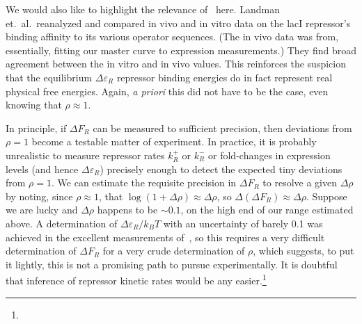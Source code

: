 We would also like to highlight the relevance of~\cite{Landman2019} here.
Landman et.\ al.\ reanalyzed and compared in vivo and in vitro data on the lacI
repressor's binding affinity to its various operator sequences. (The in vivo
data was from, essentially, fitting our master curve to expression
measurements.) They find broad agreement between the in vitro and in vivo
values. This reinforces the suspicion that the equilibrium $\Delta\varepsilon_R$
repressor binding energies do in fact represent real physical free energies.
Again, \textit{a priori} this did not have to be the case, even knowing that
$\rho\approx1$.

In principle, if $\Delta F_R$ can be measured to sufficient precision, then
deviations from $\rho=1$ become a testable matter of experiment. In practice, it
is probably unrealistic to measure repressor rates $k_R^+$ or $k_R^-$ or
fold-changes in expression levels (and hence $\Delta\varepsilon_R$) precisely
enough to detect the expected tiny deviations from $\rho=1$. We can estimate the
requisite precision in $\Delta F_R$ to resolve a given $\Delta\rho$ by noting,
since $\rho\approx1$, that $\log(1+\Delta\rho)\approx \Delta\rho$, so
$\Delta(\Delta F_R) \approx \Delta\rho$. Suppose we are lucky and $\Delta\rho$
happens to be $\sim0.1$, on the high end of our range estimated above. A
determination of $\Delta\varepsilon_R/k_BT$ with an uncertainty of barely 0.1
was achieved in the excellent measurements of~\cite{Razo-Mejia2018}, so this
requires a very difficult determination of $\Delta F_R$ for a very crude
determination of $\rho$, which suggests, to put it lightly, this is not a
promising path to pursue experimentally. It is doubtful that inference of
repressor kinetic rates would be any easier.\footnote{}


